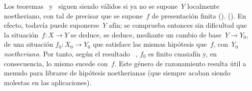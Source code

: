 \begin{remarque}
\label{VIII.6.6}
Los teoremas~ y~ siguen siendo válidos si ya no
se supone~$Y$ localmente noetheriano, con tal de precisar que se supone~$f$
de presentación finita
{(\cf {}).}
{(\cf {}).}
En efecto, todavía puede suponerse~$Y$ afín; se comprueba entonces sin
dificultad que la situación~$f\colon X\to Y$
{se deduce,}
{se deduce,}
mediante un cambio de base~$Y\to Y_{0}$, de una situación
$f_{0}\colon X_{0}\to Y_{0}$ que satisface las mismas hipótesis que~$f$,
con~$Y_{0}$ \emph{noetheriano}. Por tanto, según el
resultado~ \resp {}, $f_{0}$ es finito
\resp cuasiafín y, en consecuencia, lo mismo sucede con~$f$. Este género de
razonamiento resulta útil a menudo para librarse de hipótesis noetherianas
(que siempre acaban siendo molestas en las aplicaciones).
\end{remarque}
